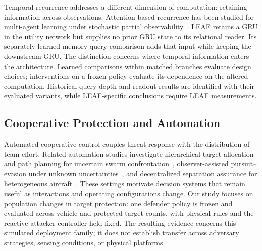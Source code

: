 Temporal recurrence addresses a different dimension of computation: retaining information across observations. Attention-based recurrence has been studied for multi-agent learning under stochastic partial observability~\cite{phan2023aerial}. LEAF retains a GRU in the utility network but supplies no prior GRU state to its relational reader. Its separately learned memory-query comparison adds that input while keeping the downstream GRU. The distinction concerns where temporal information enters the architecture. Learned comparisons within matched branches evaluate design choices; interventions on a frozen policy evaluate its dependence on the altered computation. Historical-query depth and readout results are identified with their evaluated variants, while LEAF-specific conclusions require LEAF measurements.

\subsection{Cooperative Protection and Automation}
Automated cooperative control couples threat response with the distribution of team effort. Related automation studies investigate hierarchical target allocation and path planning for uncertain swarm confrontation~\cite{wu2025swarm}, observer-assisted pursuit--evasion under unknown uncertainties~\cite{liu2025observer}, and decentralized separation assurance for heterogeneous aircraft~\cite{brittain2022separation}. These settings motivate decision systems that remain useful as interactions and operating configurations change. Our study focuses on population changes in target protection: one defender policy is frozen and evaluated across vehicle and protected-target counts, with physical rules and the reactive attacker controller held fixed. The resulting evidence concerns this simulated deployment family; it does not establish transfer across adversary strategies, sensing conditions, or physical platforms.
